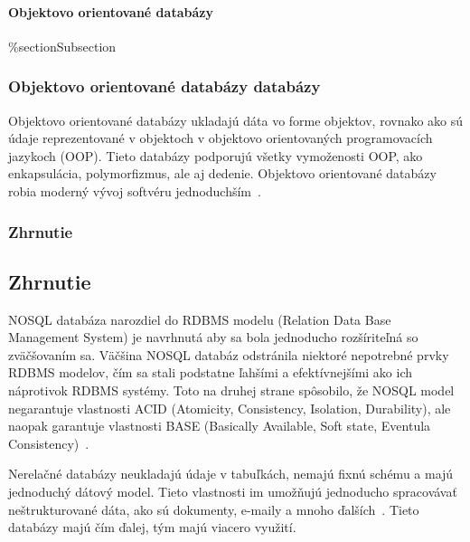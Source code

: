 %
%
{
	\paragraph{Objektovo orientované databázy}
}
{
	\%section{Subsection}
	\subsubsection{Objektovo orientované databázy databázy}
}
\label{subsubsection:object_oriented_db}
Objektovo orientované databázy ukladajú dáta vo forme objektov, rovnako ako sú údaje reprezentované v objektoch v objektovo orientovaných programovacích jazykoch (OOP). Tieto databázy podporujú všetky vymoženosti OOP, ako enkapsulácia, polymorfizmus, ale aj dedenie. Objektovo orientované databázy robia moderný vývoj softvéru jednoduchším~\cite{NoSQLDBvsRealtionDB}.

%
%
{
	\subsubsection{Zhrnutie}
}
{
	\subsection{Zhrnutie}
}
NOSQL databáza narozdiel do RDBMS modelu (Relation Data Base Management System) je
navrhnutá aby sa bola jednoducho rozšíriteľná so zväčšovaním sa. Väčšina NOSQL databáz odstránila niektoré nepotrebné prvky RDBMS modelov, čím sa stali podstatne ľahšími a efektívnejšími ako ich náprotivok RDBMS systémy. Toto na druhej strane spôsobilo, že NOSQL model negarantuje vlastnosti ACID (Atomicity, Consistency, Isolation, Durability), ale naopak garantuje vlastnosti BASE (Basically Available, Soft state, Eventula Consistency)~\cite{NoSQLDBvsRealtionDB}.

Nerelačné databázy neukladajú údaje v tabuľkách, nemajú fixnú schému a majú jednoduchý dátový model. Tieto vlastnosti im umožňujú jednoducho spracovávať neštrukturované dáta, ako sú dokumenty, e-maily a mnoho ďalších~\cite{MongoDBvsMySQL2015}. Tieto databázy majú čím ďalej, tým majú viacero využití.

